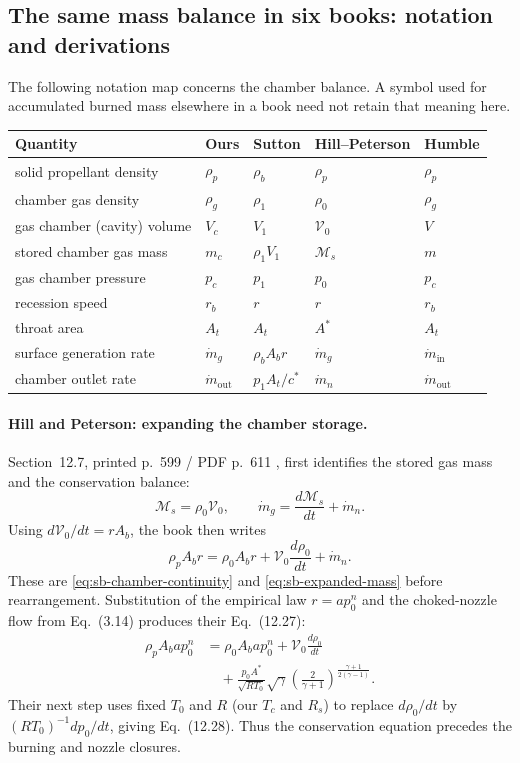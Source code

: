 \subsection{The same mass balance in six books: notation and derivations}
\label{sec:sb-mass-notation}
The following notation map concerns the chamber balance. A symbol used
for accumulated burned mass elsewhere in a book need not retain that
meaning here.
\begin{center}
\begin{tabular}{lllll}
Quantity & Ours & Sutton & Hill--Peterson & Humble\\ \hline
solid propellant density & $\rho_p$ & $\rho_b$ & $\rho_p$ & $\rho_p$\\
chamber gas density & $\rho_g$ & $\rho_1$ & $\rho_0$ & $\rho_g$\\
gas chamber (cavity) volume & $V_c$ & $V_1$ & $\mathcal V_0$ & $V$\\
stored chamber gas mass & $m_c$ & $\rho_1V_1$ & $\mathcal M_s$ & $m$\\
gas chamber pressure & $p_c$ & $p_1$ & $p_0$ & $p_c$\\
recession speed & $r_b$ & $r$ & $r$ & $r_b$\\
throat area & $A_t$ & $A_t$ & $A^*$ & $A_t$\\
surface generation rate & $\dot m_g$ & $\rho_b A_b r$
 & $\dot m_g$ & $\dot m_{\mathrm{in}}$\\
chamber outlet rate & $\dot m_{\mathrm{out}}$ & $p_1A_t/c^*$
 & $\dot m_n$ & $\dot m_{\mathrm{out}}$
\end{tabular}
\end{center}

\paragraph{Hill and Peterson: expanding the chamber storage.}
Section~12.7, printed p.~599 / PDF p.~611 \cite{hillpeterson},
first identifies the stored gas mass and the conservation balance:
\[
 \mathcal M_s=\rho_0\mathcal V_0,\qquad
 \dot m_g=\frac{d\mathcal M_s}{dt}+\dot m_n.
\]
Using $d\mathcal V_0/dt=rA_b$, the book then writes
\[
 \rho_p A_b r
 =\rho_0 A_b r+\mathcal V_0\frac{d\rho_0}{dt}+\dot m_n.
\]
These are \eqref{eq:sb-chamber-continuity} and
\eqref{eq:sb-expanded-mass} before rearrangement. Substitution of the
empirical law $r=ap_0^n$ and the choked-nozzle flow from Eq.~(3.14)
produces their Eq.~(12.27):
\begin{align*}
 \rho_p A_b a p_0^n
 &=\rho_0 A_b a p_0^n+\mathcal V_0\frac{d\rho_0}{dt}\\
 &\quad+\frac{p_0 A^*}{\sqrt{RT_0}}\sqrt{\gamma}
 \left(\frac{2}{\gamma+1}\right)^{\frac{\gamma+1}{2(\gamma-1)}}.
\end{align*}
Their next step uses fixed $T_0$ and $R$ (our $T_c$ and $R_s$) to replace
$d\rho_0/dt$ by $(RT_0)^{-1}dp_0/dt$, giving Eq.~(12.28).
Thus the conservation equation precedes the burning and nozzle closures.


